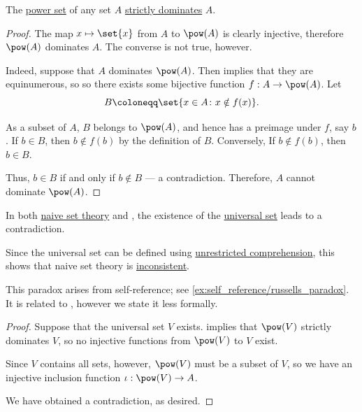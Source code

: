 \begin{theorem}\label{thm:cantors_power_set_theorem}
  The \hyperref[def:power_set]{power set} of any set \( A \) \hyperref[def:set_domination]{strictly dominates} \( A \).
\end{theorem}
\begin{proof}
  The map \( x \mapsto \set{ x } \) from \( A \) to \( \pow(A) \) is clearly injective, therefore \( \pow(A) \) dominates \( A \). The converse is not true, however.

  Indeed, suppose that \( A \) dominates \( \pow(A) \). Then  implies that they are equinumerous, so so there exists some bijective function \( f: A \to \pow(A) \). Let
  \begin{equation*}
    B \coloneqq \set{ x \in A \colon x \notin f(x) }.
  \end{equation*}

  As a subset of \( A \), \( B \) belongs to \( \pow(A) \), and hence has a preimage under \( f \), say \( b \). If \( b \in B \), then \( b \notin f(b) \) by the definition of \( B \). Conversely, If \( b \notin f(b) \), then \( b \in B \).

  Thus, \( b \in B \) if and only if \( b \notin B \) --- a contradiction. Therefore, \( A \) cannot dominate \( \pow(A) \).
\end{proof}

\begin{theorem}\label{thm:cantors_paradox}
  In both \hyperref[def:naive_set_theory]{naive set theory} and \hyperref[def:zfc]{}, the existence of the \hyperref[def:universal_set]{universal set} leads to a contradiction.
\end{theorem}
\begin{comments}
  \item Since the universal set can be defined using \hyperref[def:naive_set_theory/comprehension]{unrestricted comprehension}, this shows that naive set theory is \hyperref[def:fol_theory/consistent]{inconsistent}.

  \item This paradox arises from self-reference; see \cref{ex:self_reference/russells_paradox}. It is related to , however we state it less formally.
\end{comments}
\begin{proof}
  Suppose that the universal set \( V \) exists.  implies that \( \pow(V) \) strictly dominates \( V \), so no injective functions from \( \pow(V) \) to \( V \) exist.

  Since \( V \) contains all sets, however, \( \pow(V) \) must be a subset of \( V \), so we have an injective inclusion function \( \iota: \pow(V) \to A \).

  We have obtained a contradiction, as desired.
\end{proof}

